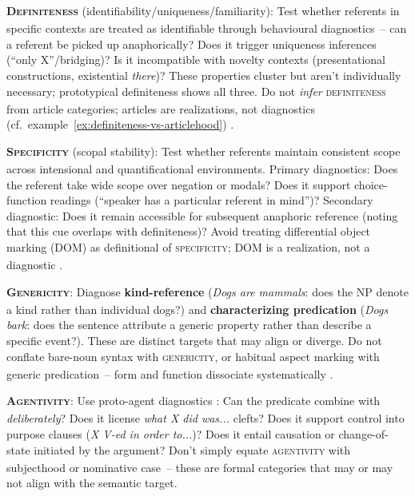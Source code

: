 \documentclass[12pt]{article}
\begin{document}
\begin{exe}
\ex\label{ex:definiteness-cc} \textbf{\textsc{Definiteness}\textsubscript{\Cross}} (identifiability/uniqueness/familiarity): Test whether referents in specific contexts are treated as identifiable through behavioural diagnostics~-- can a referent be picked up anaphorically? Does it trigger uniqueness inferences (\enquote{only X}/bridging)? Is it incompatible with novelty contexts (presentational constructions, existential \textit{there})? These properties cluster but aren't individually necessary; prototypical definiteness shows all three. Do not \emph{infer} \textsc{definiteness}\textsubscript{\Cross} from article categories; articles are realizations, not diagnostics (cf.\ example~\ref{ex:definiteness-vs-articlehood}) \parencite{Lyons1999,Heusinger2011}.

\ex\label{ex:specificity-cc} \textbf{\textsc{Specificity}\textsubscript{\Cross}} (scopal stability): Test whether referents maintain consistent scope across intensional and quantificational environments. Primary diagnostics: Does the referent take wide scope over negation or modals? Does it support choice-function readings (\enquote{speaker has a particular referent in mind})? Secondary diagnostic: Does it remain accessible for subsequent anaphoric reference (noting that this cue overlaps with definiteness)? Avoid treating differential object marking (DOM) as definitional of \textsc{specificity}\textsubscript{\Cross}; DOM is a realization, not a diagnostic \parencite{Enc1991,Heusinger2011}.

\ex\label{ex:genericity-cc} \textbf{\textsc{Genericity}\textsubscript{\Cross}}: Diagnose \textbf{kind-reference} (\textit{Dogs are mammals}: does the NP denote a kind rather than individual dogs?) and \textbf{characterizing predication} (\textit{Dogs bark}: does the sentence attribute a generic property rather than describe a specific event?). These are distinct targets that may align or diverge. Do not conflate bare-noun syntax with \textsc{genericity}\textsubscript{\Cross}, or habitual aspect marking with generic predication~-- form and function dissociate systematically \parencite{KrifkaEtAl1995,Chierchia1998}.

\ex\label{ex:agentivity-cc} \textbf{\textsc{Agentivity}\textsubscript{\Cross}}: Use proto-agent diagnostics \parencite{Dowty1991}: Can the predicate combine with \textit{deliberately}? Does it license \textit{what X did was...} clefts? Does it support control into purpose clauses (\textit{X V-ed in order to...})? Does it entail causation or change-of-state initiated by the argument? Don't simply equate \textsc{agentivity}\textsubscript{\Cross} with subjecthood or nominative case~-- these are formal categories that may or may not align with the semantic target.
\end{exe}
\end{document}
